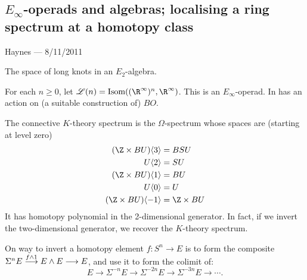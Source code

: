 \documentclass[11pt]{article}
\newcommand{\CONVERSATION}[3]{
\subsection*{#1}
\begin{flushright}
{\small #2 --- #3}
\end{flushright}
}
\begin{document}
\begin{don't show}
\CONVERSATION{$E_{\infty}$-operads and algebras; localising a ring spectrum at a homotopy class}{Haynes}{8/11/2011}
The space of long knots in an $E_2$-algebra.

For each $n\geq0$, let $\scrL(n)=\textup{Isom}((\R^\infty)^n,\R^\infty)$. This is an $E_\infty$-operad. In has an action on (a suitable construction of) $BO$.

The connective $K$-theory spectrum is the $\Omega$-spectrum whose spaces are (starting at level zero)
\begin{alignat*}{2}
(\Z\times BU)\langle 3\rangle&=BSU%
\\U\langle 2\rangle&=SU%
\\(\Z\times BU)\langle 1\rangle&=BU%
\\U\langle 0\rangle&=U%
\\(\Z\times BU)\langle -1\rangle&=\Z\times BU%
\end{alignat*}
It has homotopy polynomial in the 2-dimensional generator. In fact, if we invert the two-dimensional generator, we recover the $K$-theory spectrum.

On way to invert a homotopy element $f:S^n\to E$ is to form the composite $\Sigma^nE\overset{f\wedge1}{\longrightarrow}E\wedge E\longrightarrow E$, and use it to form the colimit of:
\[E\to\Sigma^{-n}E\to\Sigma^{-2n}E\to\Sigma^{-3n}E\to\cdots.\]


\end{don't show}
\end{document}
